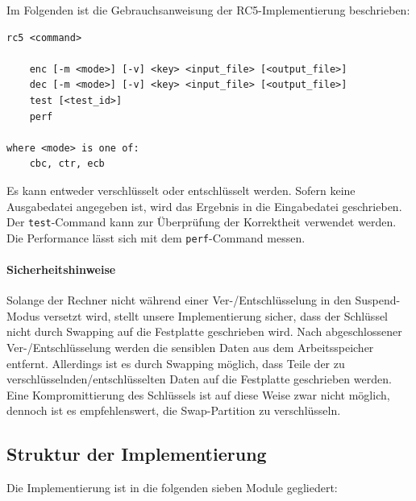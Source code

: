 \documentclass[course=erap]{aspdoc}
\begin{document}
Im Folgenden ist die Gebrauchsanweisung der RC5-Implementierung beschrieben:

\begin{samepage}
\begin{verbatim}
rc5 <command>

    enc [-m <mode>] [-v] <key> <input_file> [<output_file>]
    dec [-m <mode>] [-v] <key> <input_file> [<output_file>]
    test [<test_id>]
    perf

where <mode> is one of:
    cbc, ctr, ecb
\end{verbatim}
\end{samepage}

Es kann entweder verschlüsselt oder entschlüsselt werden. Sofern keine Ausgabedatei angegeben ist, wird das Ergebnis in die Eingabedatei geschrieben. Der \texttt{test}-Command kann zur Überprüfung der Korrektheit verwendet werden. Die Performance lässt sich mit dem \texttt{perf}-Command messen.

\paragraph{Sicherheitshinweise} Solange der Rechner nicht während einer Ver-/Entschlüsselung in den Suspend-Modus versetzt wird, stellt unsere Implementierung sicher, dass der Schlüssel nicht durch Swapping auf die Festplatte geschrieben wird. Nach abgeschlossener Ver-/Entschlüsselung werden die sensiblen Daten aus dem Arbeitsspeicher entfernt. Allerdings ist es durch Swapping möglich, dass Teile der zu verschlüsselnden/entschlüsselten Daten auf die Festplatte geschrieben werden. Eine Kompromittierung des Schlüssels ist auf diese Weise zwar nicht möglich, dennoch ist es empfehlenswert, die Swap-Partition zu verschlüsseln.

\subsection{Struktur der Implementierung}

Die Implementierung ist in die folgenden sieben Module gegliedert:
\end{document}
